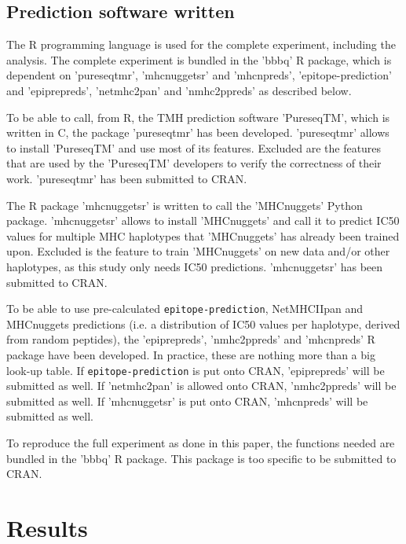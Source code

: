\subsection{Prediction software written}

The R programming language is used for the complete 
experiment, including the analysis.
The complete experiment is bundled in the 'bbbq' R package,
which is dependent on 'pureseqtmr', 
'mhcnuggetsr' and 'mhcnpreds',
'epitope-prediction' and 'epiprepreds',
'netmhc2pan' and 'nmhc2ppreds'
as described below.

To be able to call, from R, the TMH prediction software 'PureseqTM',
which is written in C, the package 'pureseqtmr' has been developed. 
'pureseqtmr' allows to install 'PureseqTM' and use most of its features.
Excluded are the features that are used by the 'PureseqTM' 
developers to verify the correctness of their work.
'pureseqtmr' has been submitted to CRAN.

The R package 'mhcnuggetsr' is written to call the 
'MHCnuggets' Python package.
'mhcnuggetsr' allows to install 'MHCnuggets' and call it
to predict IC50 values for multiple MHC haplotypes that 'MHCnuggets' 
has already been trained upon.
Excluded is the feature to train 'MHCnuggets' on new data and/or other
haplotypes, as this study only needs IC50 predictions.
'mhcnuggetsr' has been submitted to CRAN.

To be able to use pre-calculated 
\verb;epitope-prediction;, NetMHCIIpan and MHCnuggets
predictions (i.e. a distribution of IC50 values per haplotype, 
derived from random peptides), the 'epiprepreds', 'nmhc2ppreds' 
and 'mhcnpreds' R package have been 
developed. In practice, these are nothing more than a big look-up table.
If \verb;epitope-prediction; is put onto CRAN, 'epiprepreds'
will be submitted as well.
If 'netmhc2pan' is allowed onto CRAN, 'nmhc2ppreds'
will be submitted as well.
If 'mhcnuggetsr' is put onto CRAN, 'mhcnpreds'
will be submitted as well.

To reproduce the full experiment as done in this paper,
the functions needed are bundled in the 'bbbq' R package.
This package is too specific to be submitted to CRAN.

\section{Results}

